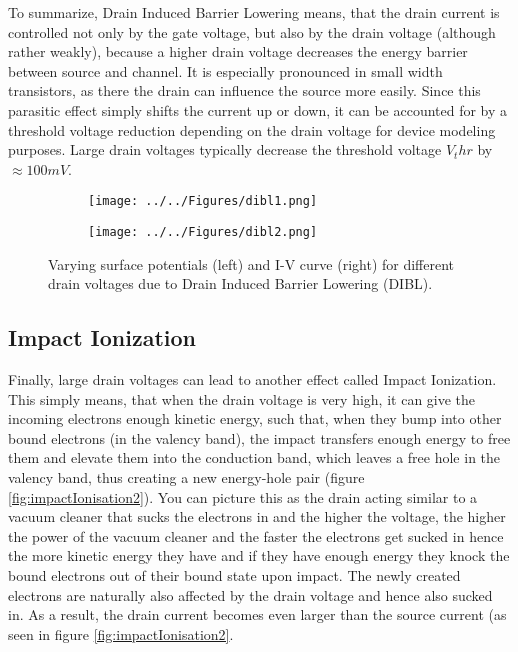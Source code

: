 To summarize, Drain Induced Barrier Lowering means, that the drain current is controlled not only by the gate voltage, but also by the drain voltage (although rather weakly), because a higher drain voltage decreases the energy barrier between source and channel. It is especially pronounced in small width transistors, as there the drain can influence the source more easily. Since this parasitic effect simply shifts the current up or down, it can be accounted for by a threshold voltage reduction depending on the drain voltage for device modeling purposes. Large drain voltages typically decrease the threshold voltage $V_thr$ by $\approx 100mV$. 

\begin{figure}
\centering
\begin{subfigure}{0.5\textwidth}
  \centering
  \texttt{[image: ../../Figures/dibl1.png]}
    \label{fig:dibl1}
\end{subfigure}%
\begin{subfigure}{0.5\textwidth}
  \centering
  \texttt{[image: ../../Figures/dibl2.png]}
    \label{fig:dibl2}
\end{subfigure}
\caption{Varying surface potentials (left) and I-V curve (right) for different drain voltages due to Drain Induced Barrier Lowering (DIBL).}
\end{figure}

\subsection{Impact Ionization}

Finally, large drain voltages can lead to another effect called Impact Ionization. This simply means, that when the drain voltage is very high, it can give the incoming electrons enough kinetic energy, such that, when they bump into other bound electrons (in the valency band), the impact transfers enough energy to free them and elevate them into the conduction band, which leaves a free hole in the valency band, thus creating a new energy-hole pair (figure \ref{fig:impactIonisation2}). You can picture this as the drain acting similar to a vacuum cleaner that sucks the electrons in and the higher the voltage, the higher the power of the vacuum cleaner and the faster the electrons get sucked in hence the more kinetic energy they have and if they have enough energy they knock the bound electrons out of their bound state upon impact. The newly created electrons are naturally also affected by the drain voltage and hence also sucked in. As a result, the drain current becomes even larger than the source current (as seen in figure \ref{fig:impactIonisation2}.\\


